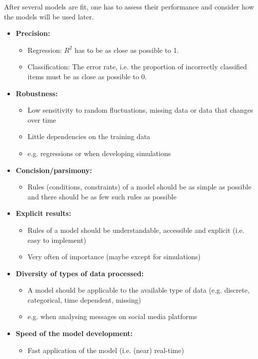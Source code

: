 \documentclass[a4paper, landscape, 6pt, fleqn]{scrartcl}
\renewcommand{\emph}[1]{\textbf{#1}}
\begin{document}
\begin{multicols*}{4}
After several models are fit, one has to assess their performance and consider how the models will be used later.

\begin{itemize}
\item \emph{Precision:}
\begin{itemize}
\item Regression: $R^2$ has to be as close as possible to 1.
\item Classification: The error rate, i.e. the proportion of incorrectly classified items must be as close as possible to 0.
\end{itemize}
\item \emph{Robustness:}
\begin{itemize}
\item Low sensitivity to random fluctuations, missing data or data that changes over time
\item Little dependencies on the training data
\item e.g. regressions or when developing simulations
\end{itemize}
\item \emph{Concision/parsimony:}
\begin{itemize}
\item Rules (conditions, constraints) of a model should be as simple as possible and there should be as few such rules as possible
\end{itemize}
\item \emph{Explicit results:}
\begin{itemize}
\item Rules of a model should be understandable, accessible and explicit (i.e. easy to implement)
\item Very often of importance (maybe except for simulations)
\end{itemize}
\item \emph{Diversity of types of data processed:}
\begin{itemize}
\item A model should be applicable to the available type of data (e.g. discrete, categorical, time dependent, missing)
\item e.g. when analysing messages on social media platforms
\end{itemize}
\item \emph{Speed of the model development:}
\begin{itemize}
\item Fast application of the model (i.e. (near) real-time)

\end{itemize}
\end{itemize}
\end{multicols*}
\end{document}
